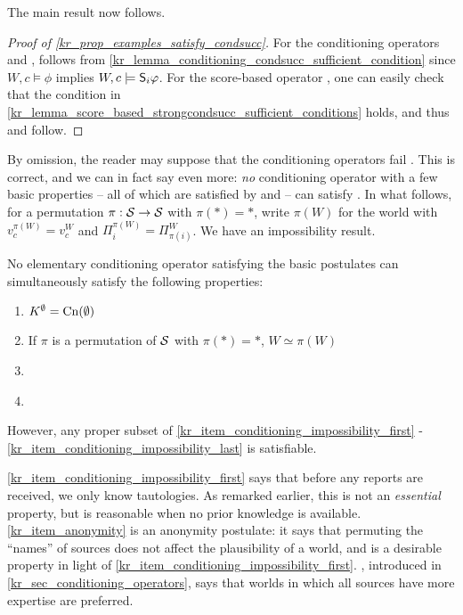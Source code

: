 The main result now follows.

\begin{proof}[Proof of \cref{kr_prop_examples_satisfy_condsucc}]
    For the conditioning operators \varbasedcond{} and \partbasedcond{},
    \condsucc{} follows from
    \cref{kr_lemma_conditioning_condsucc_sufficient_condition} since $W, c \models
    \phi$ implies $W, c \models \S_i\phi$. For the score-based operator
    \scorebasedop{}, one can easily check that the condition in
    \cref{kr_lemma_score_based_strongcondsucc_sufficient_conditions} holds, and
    thus \strongcondsucc{} and \condsucc{} follow.
\end{proof}

By omission, the reader may suppose that the conditioning operators fail
\strongcondsucc{}. This is correct, and we can in fact say even more: \emph{no}
conditioning operator with a few basic properties -- all of which are satisfied
by \varbasedcond{} and \partbasedcond{} -- can satisfy \strongcondsucc{}.
%
In what follows, for a permutation $\pi: \srcs \to \srcs$ with $\pi(\ast) = \ast$,
write $\pi(W)$ for the world with $v^{\pi(W)}_c = v^W_c$ and $\Pi^{\pi(W)}_i =
\Pi^W_{\pi(i)}$. We have an impossibility result.

\begin{proposition}
    \label{kr_prop_strongcondsucc_conditioning_impossibilitity}
    No elementary conditioning operator satisfying the basic postulates can
    simultaneously satisfy the following properties:
    \begin{enumerate}
        \item \label{kr_item_conditioning_impossibility_first}
              $K^\emptyset = \cn(\emptyset)$

        \item \label{kr_item_anonymity}
              If $\pi$ is a permutation of $\srcs$ with $\pi(\ast) = \ast$, $W
              \simeq \pi(W)$

        \item {}

        \item \label{kr_item_conditioning_impossibility_last} \strongcondsucc{}
    \end{enumerate}
    However, any proper subset of
    \cref{kr_item_conditioning_impossibility_first} -
    \cref{kr_item_conditioning_impossibility_last} is satisfiable.
\end{proposition}

\cref{kr_item_conditioning_impossibility_first} says that before any
reports are received, we only know tautologies. As remarked earlier, this is
not an \emph{essential} property, but is reasonable when no prior knowledge is
available. \cref{kr_item_anonymity} is an anonymity postulate: it says that
permuting the ``names'' of sources does not affect the plausibility of a world,
and is a desirable property in light of
\cref{kr_item_conditioning_impossibility_first}. , introduced
in \cref{kr_sec_conditioning_operators}, says that worlds in which all sources
have more expertise are preferred.

